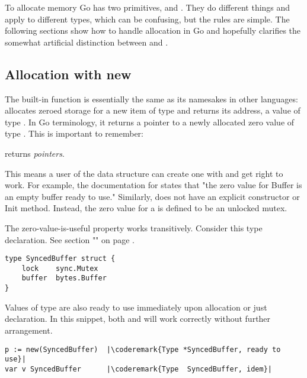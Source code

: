 To allocate memory Go has two primitives,  and . They do different
things and apply to different types, which can be confusing, but the
rules are simple.
The following sections show how to handle allocation
in Go and hopefully clarifies the somewhat artificial distinction between
 and . 

\subsection{Allocation with new}
\label{sec:allocation with new}
The built-in function  is 
essentially the same as its namesakes in other languages: 
allocates zeroed storage for a new item of type  and returns its
address, a value of type . In Go terminology, it returns a pointer to
a newly allocated zero value of type . This is important to
remember:
\begin{lbar}[]
 returns \emph{pointers}.
\end{lbar}

This
means a user of the data structure can create one with  and get
right to work. For example, the documentation for  states
that "the zero value for Buffer is an empty buffer ready to use."
Similarly,  does not have an explicit constructor or Init
method. Instead, the zero value for a  is defined to be an
unlocked mutex.

The zero-value-is-useful property works transitively. Consider this type
declaration. See section "" on page
\pageref{sec:defining your own}.

\begin{lstlisting}
type SyncedBuffer struct {
    lock    sync.Mutex
    buffer  bytes.Buffer
}
\end{lstlisting}
Values of type  are also ready to use immediately upon
allocation or just declaration. In this snippet, both  and
 will work
correctly without further arrangement.
\begin{lstlisting}
p := new(SyncedBuffer)  |\coderemark{Type *SyncedBuffer, ready to use}|
var v SyncedBuffer      |\coderemark{Type  SyncedBuffer, idem}|
\end{lstlisting}

